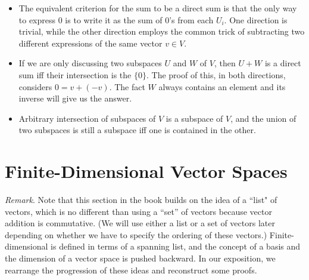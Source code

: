 \documentclass{article}
\begin{document}
\begin{itemize}
    \item The equivalent criterion for the sum to be a direct sum is that the only way to express $0$ is to write it as the sum of $0$'s from each $U_i$. One direction is trivial, while the other direction employs the common trick of subtracting two different expressions of the same vector $v \in V$.
    \item If we are only discussing two subspaces $U$ and $W$ of $V$, then $U+W$ is a direct sum iff their intersection is the $\{0\}$. The proof of this, in both directions, considers $0 = v + (-v)$. The fact $W$ always contains an element and its inverse will give us the answer.
    \item Arbitrary intersection of subspaces of $V$ is a subspace of $V$, and the union of two subspaces is still a subspace iff one is contained in the other.
\end{itemize}

\section{Finite-Dimensional Vector Spaces}

\textit{Remark}. Note that this section in the book builds on the idea of a ``list" of vectors, which is no different than using a ``set'' of vectors because vector addition is commutative. (We will use either a list or a set of vectors later depending on whether we have to specify the ordering of these vectors.) Finite-dimensional is defined in terms of a spanning list, and the concept of a basis and the dimension of a vector space is pushed backward. In our exposition, we rearrange the progression of these ideas and reconstruct some proofs.
\end{document}
